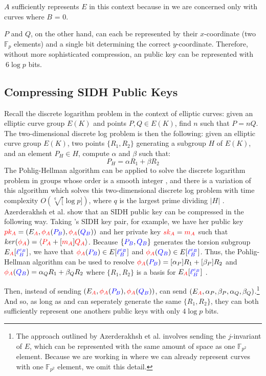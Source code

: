 $A$ sufficiently represents $E$ in this context because in \sidh we are concerned only with curves where $B$ = 0.

$P$ and $Q$, on the other hand, can each be represented by their $x$-coordinate (two $\mathbb{F}_{p}$ elements) and a single bit determining the correct $y$-coordinate. Therefore, without more sophisticated compression, an \sidh public key can be represented with $~6\log p$ bits.

\subsection{Compressing SIDH Public Keys}
\label{subsec:azercompression}

Recall the discrete logarithm problem in the context of elliptic curves: given an elliptic curve group $E(K)$ and points $P, Q \in E(K)$, find $n$ such that $P = nQ$. The two-dimensional discrete log problem is then the following: given an elliptic curve group $E(K)$, two points $\{R_1, R_2\}$ generating a subgroup $H$ of $E(K)$, and an element $P_{H} \in H$, compute $\alpha$ and $\beta$ such that:
$$
P_{H} = \alpha R_1 + \beta R_2
$$
The Pohlig-Hellman algorithm can be applied to solve the discrete logarithm problem in groups whose order is a smooth integer \cite{ph}, and there is a variation of this algorithm which solves this two-dimensional discrete log problem with time complexity $O(\sqrt[q][\log p])$, where $q$ is the largest prime dividing $\vert H\vert$ \cite{genph}.\\

\noindent
Azerderakhsh et al. show that an SIDH public key can be compressed in the following way. Taking \alice's SIDH key pair, for example, we have her public key $\textcolor{red}{pk_A} = (E_{\textcolor{red}{A}}, \textcolor{red}{\phi_A}(\textcolor{blue}{P_B}),\textcolor{red}{\phi_A}(\textcolor{blue}{Q_B}))$ and her private key $\textcolor{red}{sk_A} = \textcolor{red}{m_A}$ such that $ker(\textcolor{red}{\phi_A}) = \langle \textcolor{red}{P_A} + [\textcolor{red}{m_A}]\textcolor{red}{Q_A}\rangle$. Because $\{\textcolor{blue}{P_B}, \textcolor{blue}{Q_B}\}$ generates the torsion subgroup $E
_{\textcolor{red}{A}}[\textcolor{blue}{\ell_{B}^{e_B}}]$, we have that $\textcolor{red}{\phi_A}(\textcolor{blue}{P_B}) \in E[\textcolor{blue}{\ell_{B}^{e_B}}]$ and $\textcolor{red}{\phi_A}(\textcolor{blue}{Q_B}) \in E[\textcolor{blue}{\ell_{B}^{e_B}}]$. Thus, the Pohlig-Hellman algorithm can be used to resolve $\textcolor{red}{\phi_A}(\textcolor{blue}{P_B}) = [\alpha_P] R_1 + [\beta_P] R_2$ and $\textcolor{red}{\phi_A}(\textcolor{blue}{Q_B}) = \alpha_Q R_1 + \beta_Q R_2$ where $\{R_1, R_2\}$ is a basis for $E_{\textcolor{red}{A}}[\textcolor{blue}{\ell_{B}^{e_B}}]$ \cite{compwr}.

Then, instead of sending \bob $(E_{\textcolor{red}{A}}, \textcolor{red}{\phi_A}(\textcolor{blue}{P_B}),\textcolor{red}{\phi_A}(\textcolor{blue}{Q_B}))$, \alice can send $(E_{\textcolor{red}{A}}, \alpha_P, \beta_P, \alpha_Q, \beta_Q)$.\footnote{The approach outlined by Azerderakhsh et al. involves sending the $j$-invariant of $E$, which can be represented with the same amount of space as one $\mathbb{F}_{p^2}$ element. Because we are working in \sidh where we can already represent curves with one $\mathbb{F}_{p^2}$ element, we omit this detail.} And so, as long as \alice and \bob can seperately generate the same $\{R_1, R_2\}$, they can both sufficiently represent one anothers public keys with only $4\log p$ bits.\\


